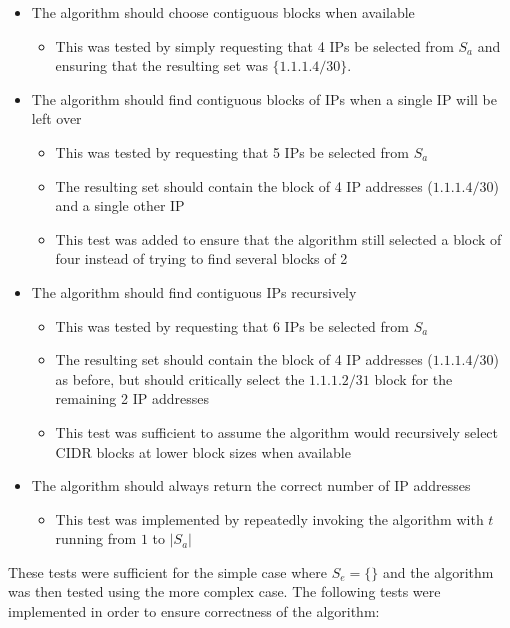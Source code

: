 \begin{itemize}
\item{The algorithm should choose contiguous blocks when available}
      \begin{itemize}
      \item{This was tested by simply requesting that 4 IPs be selected from $S_a$ and ensuring that the resulting set was $\{1.1.1.4/30\}$.}
      \end{itemize}
\item{The algorithm should find contiguous blocks of IPs when a single IP will be left over}
      \begin{itemize}
      \item{This was tested by requesting that 5 IPs be selected from $S_a$}
      \item{The resulting set should contain the block of 4 IP addresses ($1.1.1.4/30$) and a single other IP}
      \item{This test was added to ensure that the algorithm still selected a block of four instead of trying to find several blocks of 2}
      \end{itemize}
\item{The algorithm should find contiguous IPs recursively}
      \begin{itemize}
      \item{This was tested by requesting that 6 IPs be selected from $S_a$}
      \item{The resulting set should contain the block of 4 IP addresses ($1.1.1.4/30$) as before, but should critically select the $1.1.1.2/31$ block for the remaining 2 IP addresses}
      \item{This test was sufficient to assume the algorithm would recursively select CIDR blocks at lower block sizes when available}
      \end{itemize}
\item{The algorithm should always return the correct number of IP addresses}
      \begin{itemize}
      \item{This test was implemented by repeatedly invoking the algorithm with $t$ running from $1$ to $|S_a|$}
      \end{itemize}
\end{itemize}

These tests were sufficient for the simple case where $S_e = \{\}$ and the algorithm was then tested using the more complex case. The following tests were implemented in order to ensure correctness of the algorithm:

